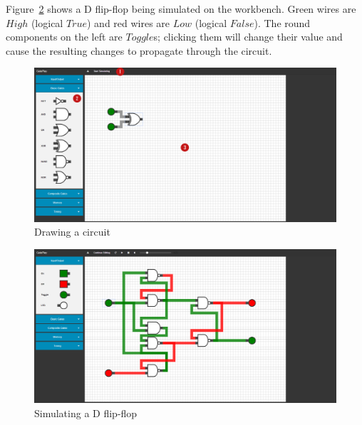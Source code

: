 Figure~\ref{fig:dflopflop} shows a D flip-flop being simulated on the workbench. Green wires are $High$ (logical $True$) and red wires are $Low$ (logical $False$). The round components on the left are $Toggle$s; clicking them will change their value and cause the resulting changes to propagate through the circuit.

\begin{figure}[p]
    \centering
    \includegraphics[width=\textheight,angle=90]{labelled.png}
    \caption{Drawing a circuit}
    \label{fig:interface}
\end{figure}

\begin{figure}[p]
    \centering
    \includegraphics[width=\textheight,angle=90]{dflipflop.png}
    \caption{Simulating a D flip-flop}
    \label{fig:dflopflop}
\end{figure}